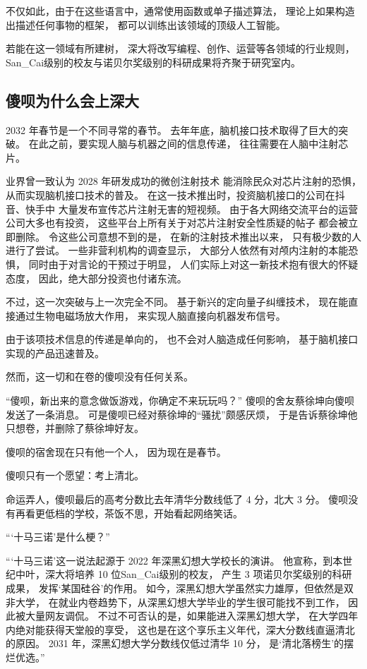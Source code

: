 \documentclass[UTF8,a4paper,11pt]{ctexart}
\newcommand{\p}{傻呗} %
\newcommand{\q}{蔡徐坤} %
\newcommand{\X}{深黑幻想大学} %
\newcommand{\x}{深大} %
\newcommand{\y}{某国} %
\newcommand{\z}{San\_Cai} %
\begin{document}
      不仅如此，由于在这些语言中，通常使用函数或单子描述算法，
      理论上如果构造出描述任何事物的框架，
      都可以训练出该领域的顶级人工智能。

      若能在这一领域有所建树，
      \x 将改写编程、创作、运营等各领域的行业规则，
      \z 级别的校友与诺贝尔奖级别的科研成果将齐聚于研究室内。
    \subsection{\p 为什么会上\x }
      2032 年春节是一个不同寻常的春节。
      去年年底，脑机接口技术取得了巨大的突破。
      在此之前，要实现人脑与机器之间的信息传递，
      往往需要在人脑中注射芯片。

      业界曾一致认为 2028 年研发成功的微创注射技术
      能消除民众对芯片注射的恐惧，
      从而实现脑机接口技术的普及。
      在这一技术推出时，投资脑机接口的公司在抖音、快手中
      大量发布宣传芯片注射无害的短视频。
      由于各大网络交流平台的运营公司大多也有投资，
      这些平台上所有关于对芯片注射安全性质疑的帖子
      都会被立即删除。
      令这些公司意想不到的是，
      在新的注射技术推出以来，
      只有极少数的人进行了尝试。
      一些非营利机构的调查显示，
      大部分人依然有对颅内注射的本能恐惧，
      同时由于对言论的干预过于明显，
      人们实际上对这一新技术抱有很大的怀疑态度，
      因此，绝大部分投资也付诸东流。

      不过，这一次突破与上一次完全不同。
      基于新兴的定向量子纠缠技术，
      现在能直接通过生物电磁场放大作用，
      来实现人脑直接向机器发布信号。
      
      由于该项技术信息的传递是单向的，
      也不会对人脑造成任何影响，
      基于脑机接口实现的产品迅速普及。

      然而，这一切和在卷的\p 没有任何关系。

      “\p，新出来的意念做饭游戏，你确定不来玩玩吗？”
      \p 的舍友\q 向\p 发送了一条消息。
      可是\p 已经对\q 的“骚扰”颇感厌烦，
      于是告诉\q 他只想卷，并删除了\q 好友。
      
      \p 的宿舍现在只有他一个人，
      因为现在是春节。

      \p 只有一个愿望：考上清北。

      命运弄人，\p 最后的高考分数比去年清华分数线低了 4 分，北大 3 分。
      \p 没有再看更低档的学校，茶饭不思，开始看起网络笑话。

      “‘十马三诺’是什么梗？”

      “‘十马三诺’这一说法起源于 2022 年\X 校长的演讲。
      他宣称，到本世纪中叶，\x 将培养 10 位\z 级别的校友，
      产生 3 项诺贝尔奖级别的科研成果，
      发挥‘\y 硅谷’的作用。
      如今，\X 虽然实力雄厚，但依然是双非大学，
      在就业内卷趋势下，从\X 毕业的学生很可能找不到工作，
      因此被大量网友调侃。
      不过不可否认的是，如果能进入\X ，
      在大学四年内绝对能获得天堂般的享受，
      这也是在这个享乐主义年代，\x 分数线直逼清北的原因。
      2031 年，\X 分数线仅低过清华 10 分，
      是‘清北落榜生’的摆烂优选。”
\end{document}
